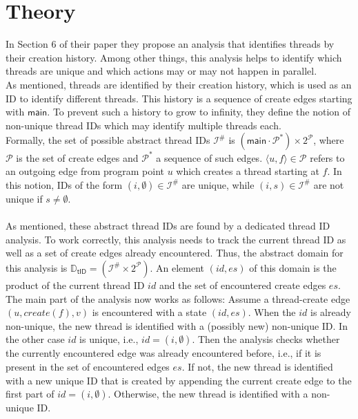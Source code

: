  \section{Theory}\label{sec:threadTheory}
  In Section 6 of their paper \parencite{schwarz2023clustered} they propose an analysis that identifies threads by their creation history. Among other things, this analysis helps to identify which threads are unique and which actions may or may not happen in parallel.\\
  As mentioned, threads are identified by their creation history, which is used as an ID to identify different threads. This history is a sequence of create edges starting with $\textsf{main}$. To prevent such a history to grow to infinity, they define the notion of non-unique thread IDs which may identify multiple threads each.\\
  Formally, the set of possible abstract thread IDs $\mathcal{I}^{\#}$ is $(\textsf{main}\cdot\mathcal{P}^*) \times 2^{\mathcal{P}}$, where $\mathcal{P}$ is the set of create edges and $\mathcal{P}^*$ a sequence of such edges. $\langle u, f \rangle \in \mathcal{P}$ refers to an outgoing edge from program point $u$ which creates a thread starting at $f$.
  In this notion, IDs of the form $(i, \emptyset) \in \mathcal{I}^{\#}$ are unique, while $(i, s) \in \mathcal{I}^{\#}$ are not unique if $s \neq \emptyset$.\\
  \\
  As mentioned, these abstract thread IDs are found by a dedicated thread ID analysis. To work correctly, this analysis needs to track the current thread ID as well as a set of create edges already encountered. Thus, the abstract domain for this analysis is $\mathbb{D}_\textsf{tID} = (\mathcal{I}^{\#} \times 2^{\mathcal{P}})$. An element $(id, es)$ of this domain is the product of the current thread ID $id$ and the set of encountered create edges $es$.\\
  The main part of the analysis now works as follows: Assume a thread-create edge $(u, create(f), v)$ is encountered with a state $(id, es)$. When the $id$ is already non-unique, the new thread is identified with a (possibly new) non-unique ID. In the other case $id$ is unique, i.e., $id = (i, \emptyset)$. Then the analysis checks whether the currently encountered edge was already encountered before, i.e., if it is present in the set of encountered edges $es$. If not, the new thread is identified with a new unique ID that is created by appending the current create edge to the first part of $id = (i, \emptyset)$. Otherwise, the new thread is identified with a non-unique ID.\\
